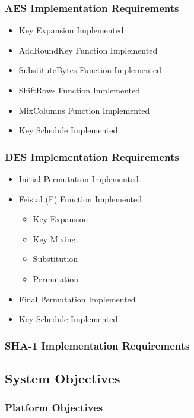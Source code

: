 \subsubsection{AES Implementation Requirements}

\begin{itemize}
\item{Key Expansion Implemented}
\item{AddRoundKey Function Implemented}
\item{SubstituteBytes Function Implemented}
\item{ShiftRows Function Implemented}
\item{MixColumns Function Implemented}
\item{Key Schedule Implemented}
\end{itemize}

\subsubsection{DES Implementation Requirements}

\begin{itemize}
\item{Initial Permutation Implemented}
\item{
Feistal (F) Function Implemented

	\begin{itemize}
		\item{Key Expansion}
		\item{Key Mixing}
		\item{Substitution}
		\item{Permutation}
	\end{itemize}
}
\item{Final Permutation Implemented}
\item{Key Schedule Implemented}
\end{itemize}

\subsubsection{SHA-1 Implementation Requirements}

\subsection{System Objectives}
\subsubsection{Platform Objectives}

